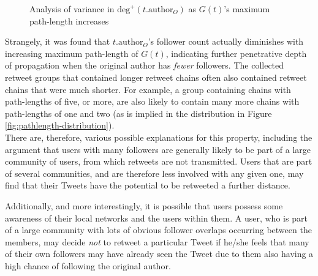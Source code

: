 \begin{figure}[h]
\centering
    \caption{Analysis of variance in $\textrm{deg}^+(t.\textrm{author}_O)$ as $G(t)$'s maximum path-length increases}
\label{fig:originalfollowers-pathlength}
\end{figure}



Strangely, it was found that $t.\textrm{author}_O$'s follower count actually diminishes with increasing maximum path-length of $G(t)$, indicating further penetrative depth of propagation when the original author has \textit{fewer} followers. The collected retweet groups that contained longer retweet chains often also contained retweet chains that were much shorter. For example, a group containing chains with path-lengths of five, or more, are also likely to contain many more chains with path-lengths of one and two (as is implied in the distribution in Figure \ref{fig:pathlength-distribution}).\\
There are, therefore, various possible explanations for this property, including the argument that users with many followers are generally likely to be part of a large community of users, from which retweets are not transmitted. Users that are part of several communities, and are therefore less involved with any given one, may find that their Tweets have the potential to be retweeted a further distance.

Additionally, and more interestingly, it is possible that users possess some awareness of their local networks and the users within them. A user, who is part of a large community with lots of obvious follower overlaps occurring between the members, may decide \textit{not} to retweet a particular Tweet if he/she feels that many of their own followers may have already seen the Tweet due to them also having a high chance of following the original author.

